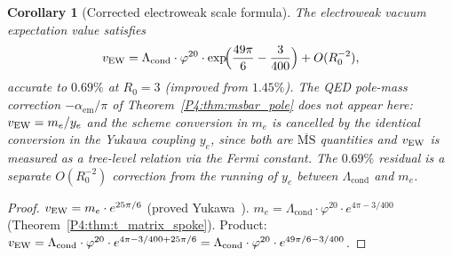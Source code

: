 \documentclass[11pt,a4paper]{article}
\newtheorem{corollary}[theorem]{Corollary}
\theoremstyle{definition}
\theoremstyle{remark}
\newcommand{\vp}{\varphi}
\newcommand{\aem}{\alpha_{\mathrm{em}}}
\newcommand{\Lcond}{\Lambda_{\mathrm{cond}}}
\begin{document}
\begin{corollary}[Corrected electroweak scale formula]
\label{P4:cor:vew_corrected}
The electroweak vacuum expectation value satisfies
\begin{equation}
  v_{\rm EW}
  = \Lcond\cdot\vp^{20}\cdot\exp\!\Bigl(\frac{49\pi}{6} - \frac{3}{400}\Bigr)
  + O(R_0^{-2}),
  \label{P4:eq:vew_corrected}
\end{equation}
accurate to $0.69\%$ at $R_0=3$ (improved from $1.45\%$).
The QED pole-mass correction $-\aem/\pi$ of Theorem~\ref{P4:thm:msbar_pole}
does not appear here: $v_{\rm EW} = m_e/y_e$ and the scheme conversion
in $m_e$ is cancelled by the identical conversion in the Yukawa coupling
$y_e$, since both are $\overline{\mathrm{MS}}$ quantities and $v_{\rm EW}$
is measured as a tree-level relation via the Fermi constant.
The $0.69\%$ residual is a separate $O(R_0^{-2})$ correction from the
running of $y_e$ between $\Lcond$ and $m_e$.
\end{corollary}

\begin{proof}
$v_{\rm EW}=m_e\cdot e^{25\pi/6}$ (proved Yukawa~\cite{Paper1}).
$m_e=\Lcond\cdot\vp^{20}\cdot e^{4\pi-3/400}$ (Theorem~\ref{P4:thm:t_matrix_spoke}).
Product: $v_{\rm EW}=\Lcond\cdot\vp^{20}\cdot e^{4\pi-3/400+25\pi/6}
=\Lcond\cdot\vp^{20}\cdot e^{49\pi/6-3/400}$.
\end{proof}
\end{document}
